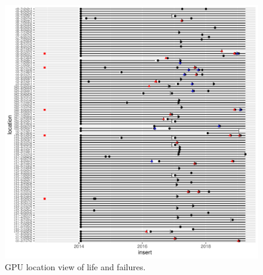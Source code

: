 \begin{figure}[ht]
  \includegraphics[width=6in]{location.pdf}
  \caption{GPU location view of life and failures.}
\end{figure}

